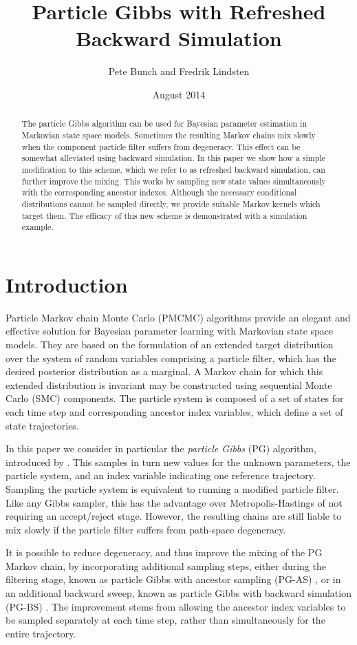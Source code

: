 \documentclass[10pt]{article}
\title{Particle Gibbs with Refreshed Backward Simulation}
\author{Pete Bunch and Fredrik Lindsten}
\date{August 2014}
\begin{document}
\maketitle

\begin{abstract}
 The particle Gibbs algorithm can be used for Bayesian parameter estimation in Markovian state space models. Sometimes the resulting Markov chains mix slowly when the component particle filter suffers from degeneracy. This effect can be somewhat alleviated using backward simulation. In this paper we show how a simple modification to this scheme, which we refer to as refreshed backward simulation, can further improve the mixing. This works by sampling new state values simultaneously with the corresponding ancestor indexes. Although the necessary conditional distributions cannot be sampled directly, we provide suitable Markov kernels which target them. The efficacy of this new scheme is demonstrated with a simulation example.
\end{abstract}
\section{Introduction}
Particle Markov chain Monte Carlo (PMCMC) algorithms \citep{Andrieu2010,Olsson2011,Chopin2013,Lindsten2014} provide an elegant and effective solution for Bayesian parameter learning with Markovian state space models. They are based on the formulation of an extended target distribution over the system of random variables comprising a particle filter, which has the desired posterior distribution as a marginal. A Markov chain for which this extended distribution is invariant may be constructed using sequential Monte Carlo (SMC) components. The particle system is composed of a set of states for each time step and corresponding ancestor index variables, which define a set of state trajectories.

In this paper we consider in particular the \emph{particle Gibbs} (PG) algorithm, introduced by \citep{Andrieu2010}. This samples in turn new values for the unknown parameters, the particle system, and an index variable indicating one reference trajectory. Sampling the particle system is equivalent to running a modified particle filter. Like any Gibbs sampler, this has the advantage over Metropolis-Hastings of not requiring an accept/reject stage. However, the resulting chains are still liable to mix slowly if the particle filter suffers from path-space degeneracy.

It is possible to reduce degeneracy, and thus improve the mixing of the PG Markov chain, by incorporating additional sampling steps, either during the filtering stage, known as particle Gibbs with ancestor sampling (PG-AS) \citep{Lindsten2014}, or in an additional backward sweep, known as particle Gibbs with backward simulation (PG-BS) \citep{Whiteley2010b,Lindsten2012}. The improvement stems from allowing the ancestor index variables to be sampled separately at each time step, rather than simultaneously for the entire trajectory.
\end{document}
